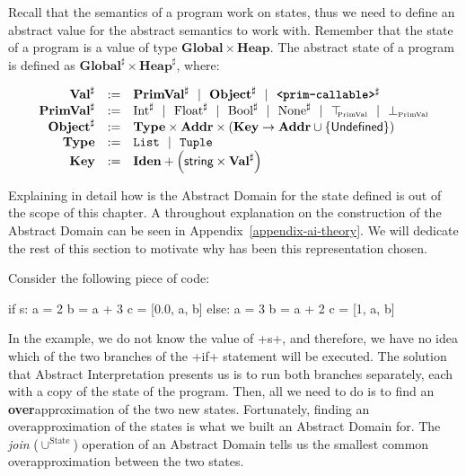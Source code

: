 Recall that the semantics of a program work on states, thus we need to define an abstract
value for the abstract semantics to work with. Remember that the state of a program is a
value of type \(\mathbf{Global} \times \mathbf{Heap}\). The abstract state of a program is defined as
\(\mathbf{Global}^\sharp \times \mathbf{Heap}^\sharp\), where:

\[\begin{array}{rcl}
   \mathbf{Val}^\sharp &:=& \mathbf{PrimVal}^\sharp ~~|~~ \mathbf{Object}^\sharp ~~|~~ \textbf{\texttt{<prim-callable>}}^\sharp \\
   \mathbf{PrimVal}^\sharp &:=& \text{Int}^\sharp ~~|~~ \text{Float}^\sharp ~~|~~ \text{Bool}^\sharp ~~|~~ \text{None}^\sharp ~~|~~ \top_{\hspace{-1mm}{\text{\tiny{PrimVal}}}} ~~|~~ \bot_{\text{\tiny{PrimVal}}}\\
   \mathbf{Object}^\sharp &:=& \mathbf{Type} \times \mathbf{Addr} \times \left(\mathbf{Key} \to \mathbf{Addr} \cup \{\mathsf{Undefined}\}\right) \\
   \mathbf{Type} &:=& \texttt{List} ~~|~~ \texttt{Tuple} \\
   \mathbf{Key} &:=& \mathbf{Iden} + \left(\textsf{string} \times \mathbf{Val}^\sharp\right) \\
\end{array}\]

Explaining in detail how is the Abstract Domain for the state defined is out of the scope
of this chapter. A throughout explanation on the construction of the Abstract Domain can
be seen in Appendix~\ref{appendix-ai-theory}. We will dedicate the rest of this section to
motivate why has been this representation chosen.

Consider the following piece of code:

\begin{pythoncode}
if s:
  a = 2
  b = a + 3
  c = [0.0, a, b]
else:
  a = 3
  b = a + 2
  c = [1, a, b]
\end{pythoncode}

In the example, we do not know the value of \pycode+s+, and therefore, we have no idea
which of the two branches of the \pycode+if+ statement will be executed. The solution that
Abstract Interpretation presents us is to run both branches separately, each with a copy
of the state of the program. Then, all we need to do is to find an
\textbf{over}approximation of the two new states. Fortunately, finding an
overapproximation of the states is what we built an Abstract Domain for. The
\textit{join} ($\cup^{\text{State}}$) operation of an Abstract Domain tells us the
smallest common overapproximation between the two states.

